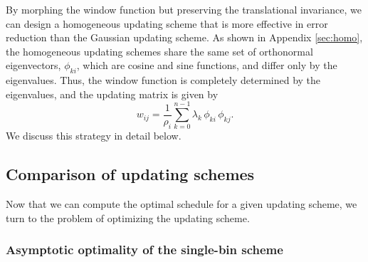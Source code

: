 \documentclass[reprint, superscriptaddress, floatfix]{revtex4-1}
\begin{document}
By morphing the window function
but preserving the translational invariance,
we can design a homogeneous updating scheme
that is more effective in error reduction
than the Gaussian updating scheme.
%
%
As shown in Appendix \ref{sec:homo},
the homogeneous updating schemes share
the same set of orthonormal eigenvectors, $\phi_{ki}$,
which are cosine and sine functions,
and differ only by the eigenvalues.
%
Thus, the window function is completely determined
by the eigenvalues, and the updating matrix
is given by\cite{bussi2006}
%
\begin{equation}
  w_{ij}
  =
  \frac{1}{\rho_i} \sum_{k=0}^{n - 1}
  \lambda_k \, \phi_{ki} \, \phi_{kj}
  .
  \label{eq:w_from_phi}
\end{equation}
%
We discuss this strategy in detail below.




\subsection{\label{sec:cmpschemes}
Comparison of updating schemes}


Now that we can compute the optimal schedule
for a given updating scheme,
we turn to the problem of optimizing
the updating scheme.


\subsubsection{\label{sec:optWL}
Asymptotic optimality of the single-bin scheme}
\end{document}
